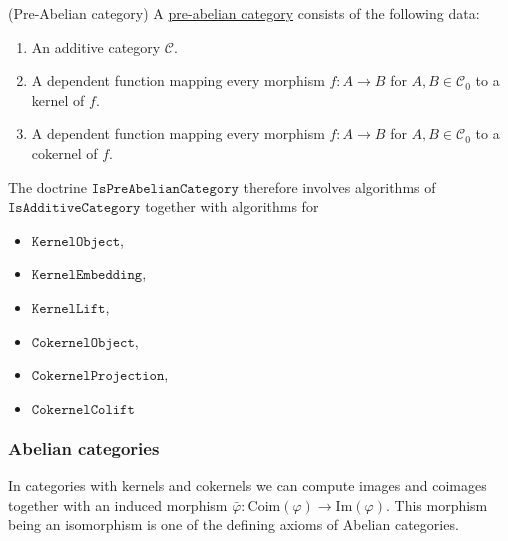 \begin{definition}{(Pre-Abelian category)}
A \ul{pre-abelian category} consists of the following data:
\begin{enumerate}
\renewcommand{\labelenumi}{(\theenumi)}
\item An additive category $\mathcal{C}$.
\item A dependent function mapping every morphism $f : A \rightarrow B$ for $A, B \in \mathcal{C}_{0}$ to a
kernel of $f$.
\item A dependent function mapping every morphism $f : A \rightarrow B$ for $A, B \in \mathcal{C}_{0}$ to a
cokernel of $f$.
\end{enumerate}
\end{definition}

\begin{doctrine}
The doctrine $\mathtt{IsPreAbelianCategory}$ therefore involves algorithms of $\mathtt{IsAdditiveCategory}$ together with algorithms for
\begin{itemize}
\item $\mathtt{KernelObject}$,
\item $\mathtt{KernelEmbedding}$,
\item $\mathtt{KernelLift}$,
\item $\mathtt{CokernelObject}$,
\item $\mathtt{CokernelProjection}$,
\item $\mathtt{CokernelColift}$
\end{itemize}
\end{doctrine}

\subsubsection{Abelian categories}

In categories with kernels and cokernels we can compute images and coimages together with an induced morphism
$\bar{\varphi} : \mathrm{Coim}(\varphi) \rightarrow \mathrm{Im}(\varphi)$. This morphism being an isomorphism
is one of the defining axioms of Abelian categories.

